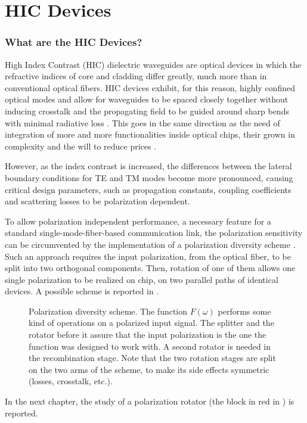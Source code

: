 \part{HIC Devices}

\section*{What are the HIC Devices?}

High Index Contrast (HIC) dielectric waveguides are optical devices in
which the refractive indices of core and cladding differ greatly, much
more than in conventional optical fibers. HIC devices exhibit, for
this reason, highly confined optical modes and allow for waveguides to
be spaced closely together without inducing crosstalk and the
propagating field to be guided around sharp bends with minimal
radiative loss \cite{watts_integrated}. This goes in the same
direction as the need of integration of more and more functionalities
inside optical chips, their grown in complexity and the will to reduce
prices \cite{exp_pirelli}.

However, as the index contrast is increased, the differences between
the lateral boundary conditions for TE and TM modes become more
pronounced, causing critical design parameters, such as propagation
constants, coupling coefficients and scattering losses to be
polarization dependent.

To allow polarization independent performance, a necessary feature for
a standard single-mode-fiber-based communication link, the
polarization sensitivity can be circumvented by the implementation of
a polarization diversity scheme \cite{madsen_optical}. Such an
approach requires the input polarization, from the optical fiber, to
be split into two orthogonal components. Then, rotation of one of them
allows one single polarization to be realized on chip, on two parallel
paths of identical devices. A possible scheme is reported in
.

\begin{figure}[htbp]
  \begin{center}
    \resizebox{12cm}{!}{}
  \end{center}
  \caption{Polarization diversity scheme. The function $F(\omega)$
    performs some kind of operations on a polarized input signal. The
    splitter and the rotator before it assure that the input
    polarization is the one the function was designed to work with. A
    second rotator is needed in the recombination stage. Note that the
    two rotation stages are split on the two arms of the scheme, to
    make its side effects symmetric (losses, crosstalk, etc.).}
  \label{fig:exp_fig1}
\end{figure}

In the next chapter, the study of a polarization rotator (the block in
red in ) is reported.

